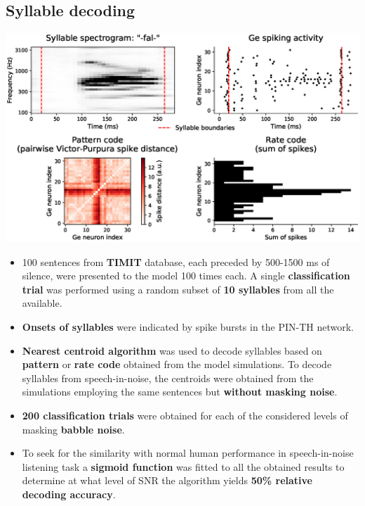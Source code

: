 \documentclass[a0,portrait]{a0poster}
\newenvironment{nitemize}{%
  \begin{itemize}[topsep=6pt,itemsep=2pt,parsep=0pt]%
}{%
  \end{itemize}%
}
\newenvironment{Figure}
  {\par\medskip\noindent\minipage{\linewidth}}
  {\endminipage\par\medskip}
\begin{document}
\begin{multicols*}{2}
\subsection*{Syllable decoding}
\begin{flushleft}
\begin{Figure}
\centering
\includegraphics[width=\linewidth,keepaspectratio]{Encoding.eps}
\end{Figure}
\normalsize
\begin{nitemize}
\item 100 sentences from \textbf{TIMIT} database, each preceded by 500-1500 ms of silence, were presented to the model 100 times each. A single \textbf{classification trial} was performed using a random subset of \textbf{10 syllables} from all the available.
\item \textbf{Onsets of syllables} were indicated by spike bursts in the PIN-TH network.
\item \textbf{Nearest centroid algorithm} was used to decode syllables based on \textbf{pattern} or \textbf{rate code} obtained from the model simulations. To decode syllables from speech-in-noise, the centroids were obtained from the simulations employing the same sentences but \textbf{without masking noise}.
\item \textbf{200 classification trials} were obtained for each of the considered levels of masking \textbf{babble noise}. 
\item To seek for the similarity with normal human performance in speech-in-noise listening task a \textbf{sigmoid function} was fitted to all the obtained results to determine at what level of SNR the algorithm yields \textbf{50\% relative decoding accuracy}.
\end{nitemize}
\end{flushleft}


\end{multicols*}
\end{document}
